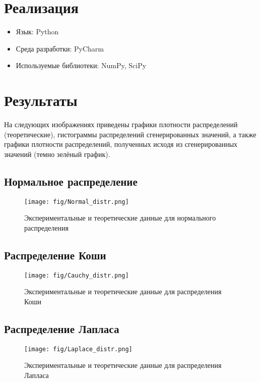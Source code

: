\section{Реализация}
\begin{itemize}
\item Язык: Python
\item Среда разработки: PyCharm
\item Используемые библиотеки: NumPy, SciPy
\end{itemize}


\section{Результаты}
На следующих изображениях приведены графики плотности распределений (теоретические), гистограммы распределений сгенерированных значений, а также графики плотности распределений, полученных исходя из сгенерированных значений (темно зелёный график).

\subsection{Нормальное распределение}
\begin{figure}[H]
	\begin{center}
		\texttt{[image: fig/Normal\_distr.png]}
		\caption{Экспериментальные и теоретические данные для нормального распределения} 
		\label{pic:pic_name} %
	\end{center}
\end{figure}

\subsection{Распределение Коши}
\begin{figure}[H]
	\begin{center}
		\texttt{[image: fig/Cauchy\_distr.png]}
		\caption{Экспериментальные и теоретические данные для распределения Коши} 
		\label{pic:pic_name} %
	\end{center}
\end{figure}

\subsection{Распределение Лапласа}
\begin{figure}[H]
	\begin{center}
		\texttt{[image: fig/Laplace\_distr.png]}
		\caption{Экспериментальные и теоретические данные для распределения Лапласа} 
		\label{pic:pic_name} %
	\end{center}
\end{figure}

